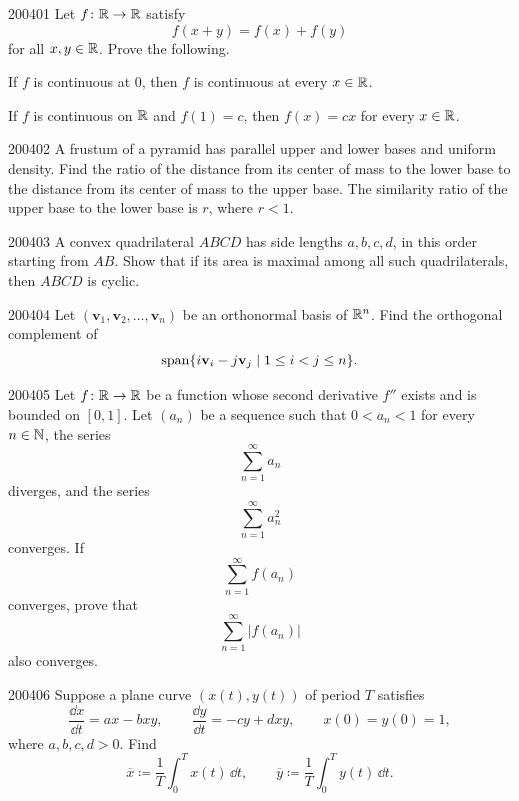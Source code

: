 
\begin{problem}{2004}{0}{1}
Let $f\colon\mathbb{R}\to\mathbb{R}$ satisfy
\[
    f(x+y)=f(x)+f(y)
\]
for all $x, y\in\mathbb{R}$. Prove the following.
\begin{problemsubparts}
    \item If $f$ is continuous at $0$, then $f$ is continuous at every $x\in\mathbb{R}$.
    \item If $f$ is continuous on $\mathbb{R}$ and $f(1)=c$, then $f(x)=cx$ for every $x\in\mathbb{R}$.
\end{problemsubparts}
\end{problem}

\begin{problem}{2004}{0}{2}
A frustum of a pyramid has parallel upper and lower bases and uniform density. Find the ratio of the distance from its center of mass to the lower base to the distance from its center of mass to the upper base. The similarity ratio of the upper base to the lower base is $r$, where $r<1$.

\end{problem}

\begin{problem}{2004}{0}{3}
A convex quadrilateral $ABCD$ has side lengths $a, b, c, d$, in this order starting from $AB$. Show that if its area is maximal among all such quadrilaterals, then $ABCD$ is cyclic.
\end{problem}

\begin{problem}{2004}{0}{4}
Let $(\mathbf v_1, \mathbf v_2, \dots, \mathbf v_n)$ be an orthonormal basis of $\mathbb{R}^n$. Find the orthogonal complement of
\[
    \operatorname{span}\{i\mathbf v_i-j\mathbf v_j\mid 1\le i<j\le n\}.
\]
\end{problem}

\begin{problem}{2004}{0}{5}
Let $f\colon\mathbb{R}\to\mathbb{R}$ be a function whose second derivative $f''$ exists and is bounded on $[0, 1]$. Let $(a_n)$ be a sequence such that $0<a_n<1$ for every $n\in\mathbb{N}$, the series
\[
    \sum_{n=1}^{\infty}a_n
\]
diverges, and the series
\[
    \sum_{n=1}^{\infty}a_n^2
\]
converges. If
\[
    \sum_{n=1}^{\infty}f(a_n)
\]
converges, prove that
\[
    \sum_{n=1}^{\infty}|f(a_n)|
\]
also converges.
\end{problem}

\begin{problem}{2004}{0}{6}
Suppose a plane curve $(x(t), y(t))$ of period $T$ satisfies
\[
    \frac{\dd x}{\dd t}=ax-bxy,
    \qquad
    \frac{\dd y}{\dd t}=-cy+dxy,
    \qquad
    x(0)=y(0)=1,
\]
where $a, b, c, d>0$. Find
\[
    \overline{x}\coloneqq\frac1T\int_0^T x(t)\, \dd t,
    \qquad
    \overline{y}\coloneqq\frac1T\int_0^T y(t)\, \dd t.
\]
\end{problem}

